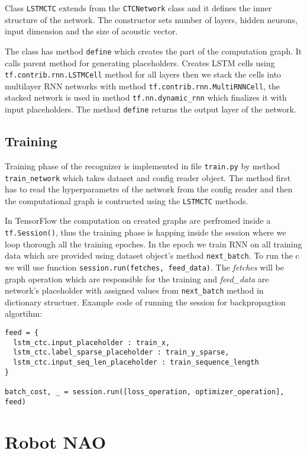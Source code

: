 Class \texttt{LSTMCTC} extends from the \texttt{CTCNetwork} class and it defines the inner structure of the network.
The constructor sets number of layers, hidden neurons, input dimension and the size of acoustic vector.

The class has method \texttt{define} which creates the part of the computation graph.
It calls parent method for generating placeholders.
Creates LSTM cells using \texttt{tf.contrib.rnn.LSTMCell} method for all layers then we stack the cells into multilayer RNN networks with method \texttt{tf.contrib.rnn.MultiRNNCell}, the stacked network is used in method \texttt{tf.nn.dynamic\_rnn} which finalizes it with input placeholders.
The method \texttt{define} returns the output layer of the network.

\subsection{Training}

Training phase of the recognizer is implemented in file \texttt{train.py} by method \texttt{train\_network} which takes dataset and config reader object.
The method first has to read the hyperparametrs of the network from the config reader and then the computational graph is contructed using the \texttt{LSTMCTC} methods.

In TensorFlow the computation on created graphs are perfromed inside a \texttt{tf.Session()}, thus the training phase is happing inside the session where we loop thorough all the training epoches.
In the epoch we train RNN on all training data which are provided using dataset object's method \texttt{next\_batch}.
To run the c we will use function \texttt{session.run(fetches, feed\_data)}. The \textit{fetches} will be graph operation which are responsible for the training and \textit{feed\_data} are network's placeholder with assigned values from \texttt{next\_batch} method in dictionary structuer.
Example code of running the session for backpropagtion algortihm:

\begin{lstlisting}
feed = {
  lstm_ctc.input_placeholder : train_x,
  lstm_ctc.label_sparse_placeholder : train_y_sparse,
  lstm_ctc.input_seq_len_placeholder : train_sequence_length
}

batch_cost, _ = session.run([loss_operation, optimizer_operation], feed)
\end{lstlisting}


\section{Robot NAO}
